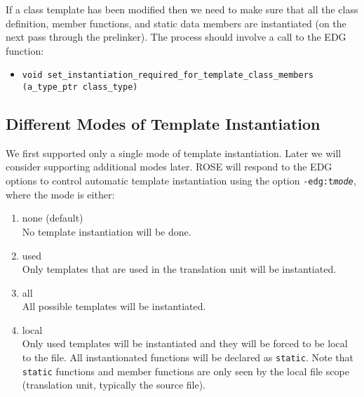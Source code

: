 \begin{enumerate}
\begin{itemize}
                     If a class template has been modified then we need to make sure that all the 
                     class definition,
                     member functions, and 
                     static data members
                     are instantiated (on the next pass through the prelinker). The process should 
                     involve a call to the EDG function:
                     \begin{itemize}
                          \item {\tt void set\_instantiation\_required\_for\_template\_class\_members (a\_type\_ptr class\_type)}
                     \end{itemize}

          \end{itemize}
\end{enumerate}

\subsection{Different Modes of Template Instantiation}
   
    We first supported only a single mode of template instantiation. Later we will
consider supporting additional modes later.
ROSE will respond to the EDG options to control automatic template instantiation using the
option {\tt -edg:t{\it mode}},
where the mode is either:
\begin{enumerate}
   \item none (default) \\
         No template instantiation will be done.
   \item used \\
         Only templates that are used in the translation unit will be instantiated.
   \item all \\
         All possible templates will be instantiated.
   \item local \\
         Only used templates will be instantiated and they will be forced to be local to
         the file.  All instantionated functions will be declared as {\tt static}.  Note that
         {\tt static} functions and member functions are only seen by the local file scope
         (translation unit, typically the source file).
\end{enumerate}


